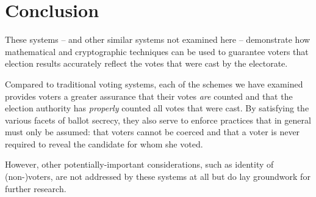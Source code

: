 \documentclass[10pt,twocolumn]{article}
\begin{document}
\section{Conclusion}

These systems -- and other similar systems not examined here -- demonstrate how mathematical and
cryptographic techniques can be used to guarantee voters that election results accurately reflect
the votes that were cast by the electorate.

Compared to traditional voting systems, each of the schemes we have examined provides voters a
greater assurance that their votes \emph{are} counted and that the election authority has
\emph{properly} counted all votes that were cast. By satisfying the various facets of ballot
secrecy, they also serve to enforce practices that in general must only be assumed: that voters
cannot be coerced and that a voter is never required to reveal the candidate for whom she voted.

However, other potentially-important considerations, such as identity of (non-)voters, are not
addressed by these systems at all but do lay groundwork for further research.



\end{document}
